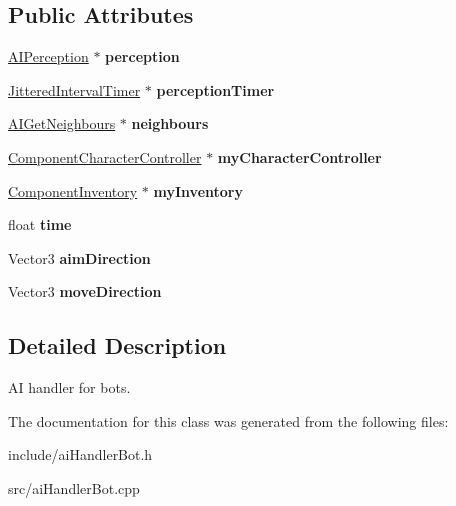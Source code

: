 \subsection*{\-Public \-Attributes}
\begin{DoxyCompactItemize}
\item 
\hypertarget{classAIHandlerBot_a249e91d1d87b342754db433019090298}{
\hyperlink{classAIPerception}{\-A\-I\-Perception} $\ast$ {\bfseries perception}}
\label{d9/d8c/classAIHandlerBot_a249e91d1d87b342754db433019090298}

\item 
\hypertarget{classAIHandlerBot_a45cd36d9aa2be49e79d4b1f56848805a}{
\hyperlink{classJitteredIntervalTimer}{\-Jittered\-Interval\-Timer} $\ast$ {\bfseries perception\-Timer}}
\label{d9/d8c/classAIHandlerBot_a45cd36d9aa2be49e79d4b1f56848805a}

\item 
\hypertarget{classAIHandlerBot_a9486c006e3697eb5b62d145831c77d57}{
\hyperlink{classAIGetNeighbours}{\-A\-I\-Get\-Neighbours} $\ast$ {\bfseries neighbours}}
\label{d9/d8c/classAIHandlerBot_a9486c006e3697eb5b62d145831c77d57}

\item 
\hypertarget{classAIHandlerBot_af432c11137fc0abe60b2afc89ac89e9c}{
\hyperlink{classComponentCharacterController}{\-Component\-Character\-Controller} $\ast$ {\bfseries my\-Character\-Controller}}
\label{d9/d8c/classAIHandlerBot_af432c11137fc0abe60b2afc89ac89e9c}

\item 
\hypertarget{classAIHandlerBot_a10fa0b5ef26c9750a3b3047ef3e56fb5}{
\hyperlink{classComponentInventory}{\-Component\-Inventory} $\ast$ {\bfseries my\-Inventory}}
\label{d9/d8c/classAIHandlerBot_a10fa0b5ef26c9750a3b3047ef3e56fb5}

\item 
\hypertarget{classAIHandlerBot_a616deb4875e7862fb1e4813fef028dee}{
float {\bfseries time}}
\label{d9/d8c/classAIHandlerBot_a616deb4875e7862fb1e4813fef028dee}

\item 
\hypertarget{classAIHandlerBot_a0cbc113d0b99ff9946cf182b952fda37}{
\-Vector3 {\bfseries aim\-Direction}}
\label{d9/d8c/classAIHandlerBot_a0cbc113d0b99ff9946cf182b952fda37}

\item 
\hypertarget{classAIHandlerBot_a973c8929afb7b38b5cded908692539e0}{
\-Vector3 {\bfseries move\-Direction}}
\label{d9/d8c/classAIHandlerBot_a973c8929afb7b38b5cded908692539e0}

\end{DoxyCompactItemize}


\subsection{\-Detailed \-Description}
\-A\-I handler for bots. 

\-The documentation for this class was generated from the following files\-:\begin{DoxyCompactItemize}
\item 
include/ai\-Handler\-Bot.\-h\item 
src/ai\-Handler\-Bot.\-cpp\end{DoxyCompactItemize}
